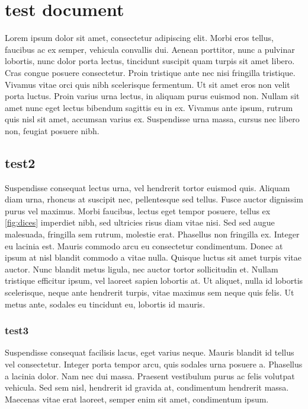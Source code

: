 \documentclass{jamk-report}
\begin{document}
\section{test document}

Lorem ipsum dolor sit amet, consectetur adipiscing elit. Morbi
eros tellus, faucibus ac ex semper, vehicula convallis dui. Aenean
porttitor, nunc a pulvinar lobortis, nunc dolor porta lectus,
tincidunt suscipit quam turpis sit amet libero. Cras congue
posuere consectetur. Proin tristique ante nec nisi fringilla
tristique. Vivamus vitae orci quis nibh scelerisque fermentum. Ut
sit amet eros non velit porta luctus. Proin varius urna lectus, in
aliquam purus euismod non. Nullam sit amet nunc eget lectus
bibendum sagittis eu in ex. Vivamus ante ipsum, rutrum quis nisl
sit amet, accumsan varius ex. Suspendisse urna massa, cursus nec
libero non, feugiat posuere nibh.


\subsection{test2}

Suspendisse consequat lectus urna, vel hendrerit tortor euismod
quis. Aliquam diam urna, rhoncus at suscipit nec, pellentesque sed
tellus. Fusce auctor dignissim purus vel maximus. Morbi faucibus,
lectus eget tempor posuere, tellus ex \ref{fig:dices} imperdiet
nibh, sed ultricies risus diam vitae nisi. Sed sed augue
malesuada, fringilla sem rutrum, molestie erat. Phasellus non
fringilla ex.  Integer eu lacinia est. Mauris commodo arcu eu
consectetur condimentum. Donec at ipsum at nisl blandit commodo a
vitae nulla.  Quisque luctus sit amet turpis vitae auctor. Nunc
blandit metus ligula, nec auctor tortor sollicitudin et. Nullam
tristique efficitur ipsum, vel laoreet sapien lobortis at. Ut
aliquet, nulla id lobortis scelerisque, neque ante hendrerit
turpis, vitae maximus sem neque quis felis. Ut metus ante, sodales
eu tincidunt eu, lobortis id mauris.

\subsubsection{test3}

Suspendisse consequat facilisis lacus, eget varius neque. Mauris
blandit id tellus vel consectetur. Integer porta tempor arcu, quis
sodales urna posuere a. Phasellus a lacinia dolor. Nam nec dui
massa. Praesent vestibulum purus ac felis volutpat vehicula. Sed
sem nisl, hendrerit id gravida at, condimentum hendrerit massa.
Maecenas vitae erat laoreet, semper enim sit amet, condimentum
ipsum.
\end{document}
